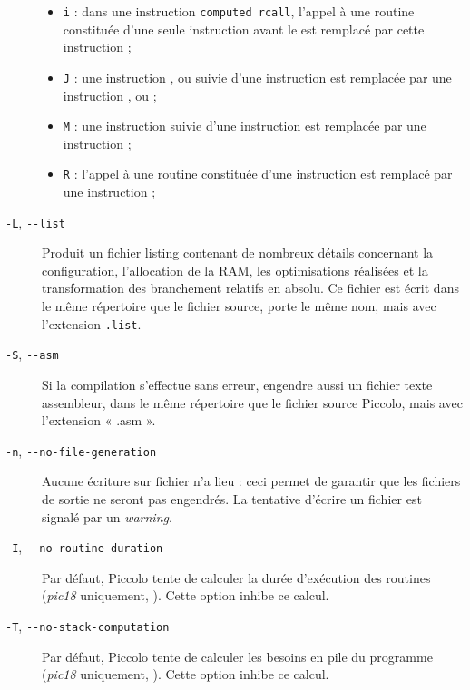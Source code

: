 \begin{description}
\begin{itemize}
  \item \texttt{i} : dans une instruction \texttt{computed rcall}, l'appel à une routine constituée d'une seule instruction avant le  est remplacé par cette instruction ;
  \item \texttt{J} : une instruction ,  ou  suivie d'une instruction  est remplacée par une instruction ,  ou  ;
  \item \texttt{M} : une instruction  suivie d'une instruction  est remplacée par une instruction  ;
  \item \texttt{R} : l'appel à une routine constituée d'une instruction  est remplacé par une instruction  ;
\end{itemize}



  \item[\texttt{-L}, \texttt{-{-}list}] Produit un fichier listing contenant de nombreux détails concernant la configuration, l’allocation de la RAM, les optimisations réalisées et la transformation des branchement relatifs en absolu. Ce fichier est écrit dans le même répertoire que le fichier source, porte le même nom, mais avec l’extension \texttt{.list}.

  \item[\texttt{-S}, \texttt{-{-}asm}] Si la compilation s’effectue sans erreur, engendre aussi un fichier texte assembleur, dans le même répertoire que le fichier source Piccolo, mais avec l’extension « .asm ».

  \item[\texttt{-n}, \texttt{-{-}no-file-generation}] Aucune écriture sur fichier n’a lieu : ceci permet de garantir que les fichiers de sortie ne seront pas engendrés. La tentative d’écrire un fichier est signalé par un \emph{warning}.

  \item[\texttt{-I}, \texttt{-{-}no-routine-duration}] Par défaut, Piccolo tente de calculer la durée d'exécution des routines (\emph{pic18} uniquement, ). Cette option inhibe ce calcul.

  \item[\texttt{-T}, \texttt{-{-}no-stack-computation}] Par défaut, Piccolo tente de calculer les besoins en pile du programme (\emph{pic18} uniquement, ). Cette option inhibe ce calcul.


\end{description}
